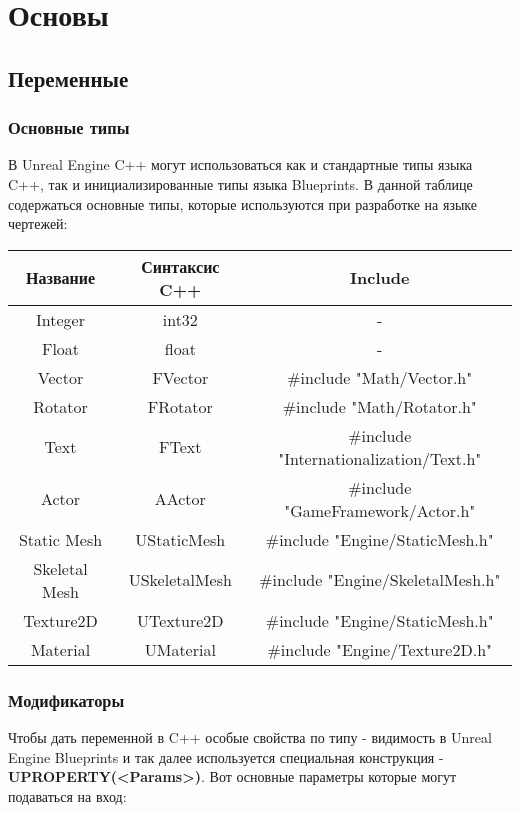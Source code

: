 \documentclass[a4paper,article,14pt]{extarticle}
\begin{document}
\tableofcontents
\pagebreak

\newpage
{}

\newpage
\section{Основы}
\subsection{Переменные}
\subsubsection{Основные типы}
В Unreal Engine C++ могут использоваться как и стандартные типы языка C++, так и инициализированные типы языка Blueprints. В данной таблице содержаться основные типы, которые используются при разработке на языке чертежей:

\begin{center}
\begin{tabular}{ |c|c|c| } 
 \hline
Название & Синтаксис C++ & Include \\ 
 \hline
Integer & int32 & - \\ 
 \hline
Float & float & - \\ 
\hline
Vector & FVector & \#include "Math/Vector.h" \\ 
\hline
Rotator & FRotator & \#include "Math/Rotator.h" \\ 
\hline
Text & FText & \#include "Internationalization/Text.h" \\ 
 \hline
Actor & AActor & \#include "GameFramework/Actor.h" \\ 
 \hline
Static Mesh & UStaticMesh & \#include "Engine/StaticMesh.h"\\ 
 \hline
Skeletal Mesh & USkeletalMesh & \#include "Engine/SkeletalMesh.h" \\
 \hline
Texture2D & UTexture2D & \#include "Engine/StaticMesh.h"\\ 
 \hline
Material & UMaterial & \#include "Engine/Texture2D.h"\\  
\hline
\end{tabular}
\end{center}

\subsubsection{Модификаторы}
Чтобы дать переменной в C++ особые свойства по типу - видимость в Unreal Engine Blueprints и так далее используется специальная конструкция - \textbf{UPROPERTY(<Params>)}. Вот основные параметры которые могут подаваться на вход:
\end{document}
